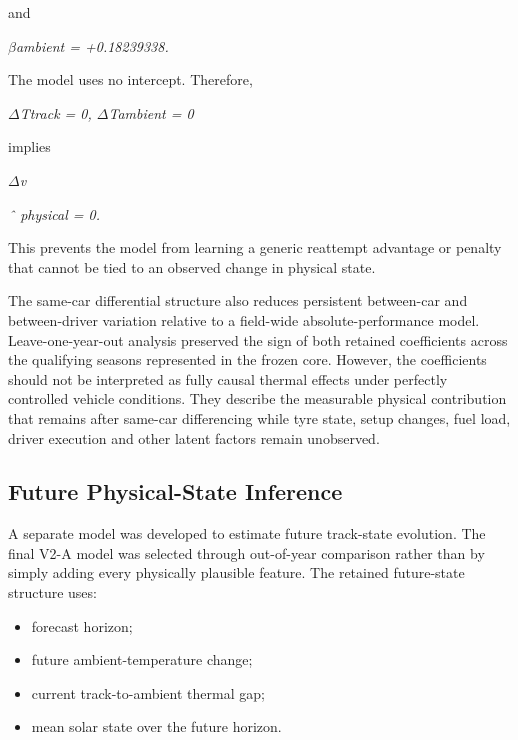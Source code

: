 and

\begin{center}\textit{\ensuremath{\beta}ambient = +0.18239338.}\end{center}

The model uses no intercept. Therefore,

\begin{center}\textit{\ensuremath{\Delta}Ttrack = 0,       \ensuremath{\Delta}Tambient = 0}\end{center}

implies

\begin{center}\textit{\ensuremath{\Delta}v}\end{center}

\begin{center}\textit{ˆ physical = 0.}\end{center}

This prevents the model from learning a generic reattempt advantage or penalty that cannot be tied to an observed change in physical state.

The same-car differential structure also reduces persistent between-car and between-driver variation relative to a field-wide absolute-performance model. Leave-one-year-out analysis preserved the sign of both retained coefficients across the qualifying seasons represented in the frozen core. However, the coefficients should not be interpreted as fully causal thermal effects under perfectly controlled vehicle conditions. They describe the measurable physical contribution that remains after same-car differencing while tyre state, setup changes, fuel load, driver execution and other latent factors remain unobserved.

\subsection{Future Physical-State Inference}
A separate model was developed to estimate future track-state evolution. The final V2-A model was selected through out-of-year comparison rather than by simply adding every physically plausible feature. The retained future-state structure uses:

\begin{itemize}
\item forecast horizon;
\item future ambient-temperature change;
\item current track-to-ambient thermal gap;
\item mean solar state over the future horizon.
\end{itemize}

